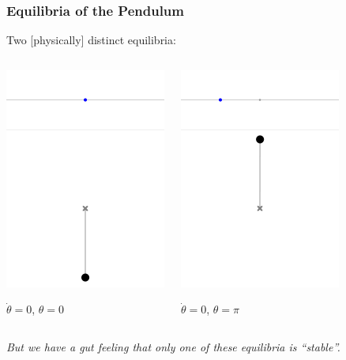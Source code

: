 \documentclass[12pt]{beamer}
\begin{document}
\begin{frame}
\frametitle{Equilibria of the Pendulum}

Two [physically] distinct equilibria:

\begin{columns}


\begin{center}
\includegraphics[width=.4\linewidth]{Pendulum_0deg.png}

$\dot\theta = 0$, $\theta=0$

\end{center}



\begin{center}
\includegraphics[width=.4\linewidth]{Pendulum_180deg.png}

$\dot\theta = 0$, $\theta=\pi$
\end{center}


\end{columns}

\vfill
\emph{But we have a gut feeling that only one of these equilibria is ``stable''.}

\end{frame}
\end{document}
